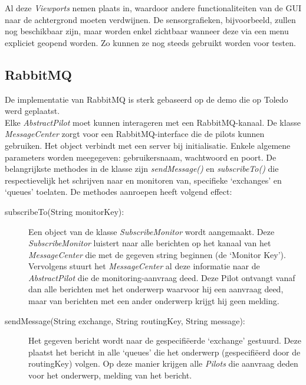 \documentclass[tt2]{penoverslag}
\begin{document}
Al deze \textit{Viewports} nemen plaats in, waardoor andere functionaliteiten van de GUI naar de achtergrond moeten verdwijnen. De sensorgrafieken, bijvoorbeeld, zullen nog beschikbaar zijn, maar worden enkel zichtbaar wanneer deze via een menu expliciet geopend worden. Zo kunnen ze nog steeds gebruikt worden voor testen.



\subsection{RabbitMQ}
\label{ssec:RabbMQ}
De implementatie van RabbitMQ  is sterk gebaseerd op de demo die op Toledo werd geplaatst.\\

Elke \textit{AbstractPilot} moet kunnen interageren met een RabbitMQ-kanaal. De klasse \textit{MessageCenter} zorgt voor een RabbitMQ-interface die de pilots kunnen gebruiken. Het object verbindt met een server bij initialisatie. Enkele algemene parameters worden meegegeven: gebruikersnaam, wachtwoord en poort. De belangrijkste methodes in de klasse zijn \textit{sendMessage()} en \textit{subscribeTo()} die respectievelijk het schrijven naar en monitoren van, specifieke `exchanges' en `queues' toelaten. De methodes aanroepen heeft volgend effect:

\begin{description}
\item[subscribeTo(String monitorKey):] Een object van de klasse \textit{SubscribeMonitor} wordt aangemaakt. Deze \textit{SubscribeMonitor} luistert naar alle berichten op het kanaal van het \textit{MessageCenter} die met de gegeven string beginnen (de `Monitor Key'). Vervolgens stuurt het \textit{MessageCenter} al deze informatie naar de \textit{AbstractPilot} die de monitoring-aanvraag deed. Deze Pilot ontvangt vanaf dan alle berichten met het onderwerp waarvoor hij een aanvraag deed, maar van berichten met een ander onderwerp krijgt hij geen melding.
\item[sendMessage(String exchange, String routingKey, String message):] Het gegeven bericht wordt naar de gespecifi\"eerde `exchange' gestuurd. Deze plaatst het bericht in alle `queues' die het onderwerp (gespecifi\"eerd door de routingKey) volgen. Op deze manier krijgen alle \textit{Pilots} die aanvraag deden voor het onderwerp, melding van het bericht.
\end{description}
\end{document}
